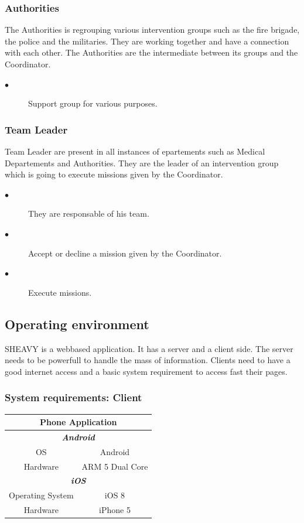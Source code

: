 \subsubsection{Authorities}
The Authorities is regrouping various intervention groups such as the fire
brigade, the police and the militaries. They are working together and have a
connection with each other. The Authorities are the intermediate between its
groups and the Coordinator.
\begin{description}
 \item[$\bullet$] Support group for various purposes. 
\end{description}

\subsubsection{Team Leader}
Team Leader are present in all instances of epartements such as Medical
Departements and Authorities. They are the leader of an intervention group which
is going to execute missions given by the Coordinator.
\begin{description}
 \item[$\bullet$] They are responsable of his team.
 \item[$\bullet$] Accept or decline a mission given by the Coordinator.
 \item[$\bullet$] Execute missions.
\end{description}

\subsection{Operating environment}
SHEAVY is a webbased application. It has a server and a client side. The server
needs to be powerfull to handle the mass of information. Clients need to have a
good internet access and a basic system requirement to access fast their
pages.\\

\subsubsection{System requirements: Client}
\begin{tabular}{|c|c|}
\hline
\multicolumn{2}{|c|}{\textbf{Phone Application}} \\
\hline
\multicolumn{2}{|c|}{\textit{\textbf{Android}}} \\
\hline
OS & Android \\
\hline
Hardware & ARM 5 Dual Core \\
\hline
\multicolumn{2}{|c|}{\textit{\textbf{iOS}}} \\
\hline
Operating System & iOS 8 \\
\hline
Hardware & iPhone 5 \\
\hline
\end{tabular}

